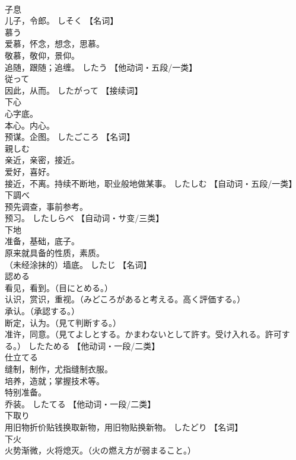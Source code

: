 \documentclass[8pt]{extreport}
\begin{document}
\begin{CJK}{UTF8}{min}
\\	子息	
\\	儿子，令郎。	しそく		【名词】
\\	慕う	
\\	爱慕，怀念，想念，思慕。 
\\	敬慕，敬仰，景仰。 
\\	追随，跟随；追缠。	したう		【他动词・五段/一类】
\\	従って	
\\	因此，从而。	したがって		【接续词】
\\	下心	
\\	心字底。 
\\	本心。内心。 
\\	预谋。企图。	したごころ		【名词】
\\	親しむ	
\\	亲近，亲密，接近。 
\\	爱好，喜好。 
\\	接近，不离。持续不断地，职业般地做某事。	したしむ		【自动词・五段/一类】
\\	下調べ	
\\	预先调查，事前参考。 
\\	预习。	したしらべ		【自动词・サ变/三类】
\\	下地	
\\	准备，基础，底子。 
\\	原来就具备的性质，素质。 
\\	（未经涂抹的）墙底。	したじ		【名词】
\\	認める	
\\	看见，看到。（目にとめる。） 
\\	认识，赏识，重视。（みどころがあると考える。高く評価する。） 
\\	承认。（承認する。） 
\\	断定，认为。（見て判断する。） 
\\	准许，同意。（見てよしとする。かまわないとして許す。受け入れる。許可する。）	したためる		【他动词・一段/二类】
\\	仕立てる	
\\	缝制，制作，尤指缝制衣服。 
\\	培养，造就；掌握技术等。 
\\	特别准备。 
\\	乔装。	したてる		【他动词・一段/二类】
\\	下取り	
\\	用旧物折价贴钱换取新物，用旧物贴换新物。	したどり		【名词】
\\	下火	
\\	火势渐微，火将熄灭。（火の燃え方が弱まること。） 

\end{CJK}
\end{document}
